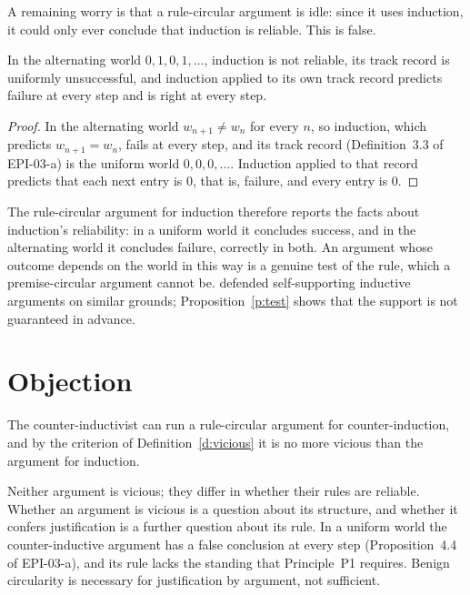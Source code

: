 \documentclass{situationist-preprint}
\begin{document}
A remaining worry is that a rule-circular argument is idle: since it uses induction, it could only ever conclude that induction is reliable. This is false.

\begin{proposition}\label{p:test}
In the alternating world $0, 1, 0, 1, \ldots$, induction is not reliable, its track record is uniformly unsuccessful, and induction applied to its own track record predicts failure at every step and is right at every step.
\end{proposition}

\begin{proof}
In the alternating world $w_{n+1} \neq w_n$ for every $n$, so induction, which predicts $w_{n+1} = w_n$, fails at every step, and its track record (Definition~3.3 of EPI-03-a) is the uniform world $0, 0, 0, \ldots$. Induction applied to that record predicts that each next entry is $0$, that is, failure, and every entry is $0$.
\end{proof}

The rule-circular argument for induction therefore reports the facts about induction's reliability: in a uniform world it concludes success, and in the alternating world it concludes failure, correctly in both. An argument whose outcome depends on the world in this way is a genuine test of the rule, which a premise-circular argument cannot be. \citet{Black1958} defended self-supporting inductive arguments on similar grounds; Proposition~\ref{p:test} shows that the support is not guaranteed in advance.

\section{Objection}

\begin{objection}
The counter-inductivist can run a rule-circular argument for counter-induction, and by the criterion of Definition~\ref{d:vicious} it is no more vicious than the argument for induction.
\end{objection}

\begin{reply}
Neither argument is vicious; they differ in whether their rules are reliable. Whether an argument is vicious is a question about its structure, and whether it confers justification is a further question about its rule. In a uniform world the counter-inductive argument has a false conclusion at every step (Proposition~4.4 of EPI-03-a), and its rule lacks the standing that Principle~P1 requires. Benign circularity is necessary for justification by argument, not sufficient.
\end{reply}
\end{document}
